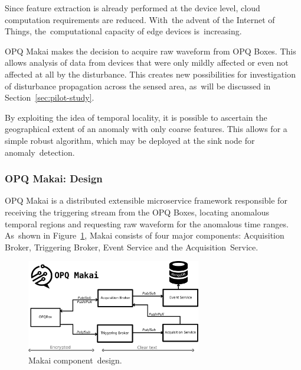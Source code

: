 \documentclass[energies,article,accept,moreauthors,pdftex]{Definitions/mdpi}
\begin{document}
 Since feature extraction is already performed at the device level, cloud computation requirements are reduced. With~the advent of the Internet of Things, the~computational capacity of edge devices is~increasing.

 OPQ Makai makes the decision to acquire raw waveform from OPQ Boxes. This allows analysis of data from devices that were only mildly affected or even not affected at all by the disturbance. This creates new possibilities for investigation of disturbance propagation across the sensed area, as~will be discussed in Section~\ref{sec:pilot-study}.

 By exploiting the idea of temporal locality, it is possible to ascertain the geographical extent of an anomaly with only coarse features. This allows for a simple robust algorithm, which may be deployed at the sink node for anomaly~detection.

\subsubsection*{OPQ Makai: Design}

OPQ Makai is a distributed extensible microservice framework responsible for receiving the triggering stream from the OPQ Boxes, locating anomalous temporal regions and requesting raw waveform for the anomalous time ranges. As~shown in Figure~\ref{fig:makai-design}, Makai consists of four major components: Acquisition Broker, Triggering Broker, Event Service and the Acquisition~Service.

\begin{figure}[H]
\center \includegraphics[width=3in]{images/makai/makai_main.pdf}
\caption{Makai component~design.}
\label{fig:makai-design}
\end{figure}
\end{document}

